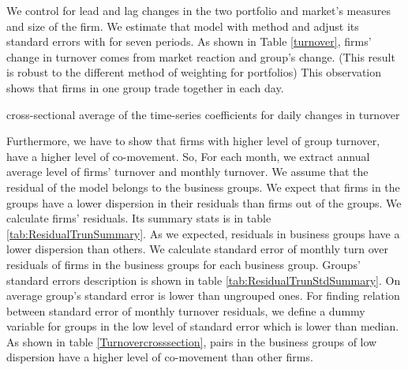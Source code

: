 	
 We control for lead and lag changes in the two portfolio and market's measures and size of the firm. We estimate that model with \cite{FamaMacBeth} method and adjust its standard errors with \cite{newey1987hypothesis} for seven periods.  As shown in Table \ref{turnover}, firms' change in turnover comes from market reaction and group's change. (This result is robust to the different method of weighting for portfolios) This observation shows that firms in one group trade together in each day. 
{\begin{table}[htbp]
	\centering
	\caption{cross-sectional average of the time-series coefficients for daily changes in turnover }
	\resizebox{!}{!}{
		
	} \label{turnover}
\end{table}}



%			
%
%
%			




Furthermore, we have to show that firms with higher level of group turnover, have a higher level of co-movement. So, For each month, we extract annual average level of firms' turnover and monthly turnover. We assume that the residual of the model belongs to the business groups. We expect that firms in the groups have a lower dispersion in their residuals than firms out of the groups. We calculate firms' residuals. Its summary stats is in table \ref{tab:ResidualTrunSummary}. As we expected, residuals in business groups have a lower dispersion than others.
We calculate standard error of monthly turn over residuals of firms in the business groups for each business group. Groups' standard errors description is shown in table \ref{tab:ResidualTrunStdSummary}. On average group's standard error is lower than ungrouped  ones. For finding relation between standard error of monthly turnover residuals, we define a dummy variable for groups in the low level of standard error which is lower than median. As shown in table \ref{Turnovercrosssection}, pairs in the business groups of low dispersion have a higher level of co-movement than other firms.  


